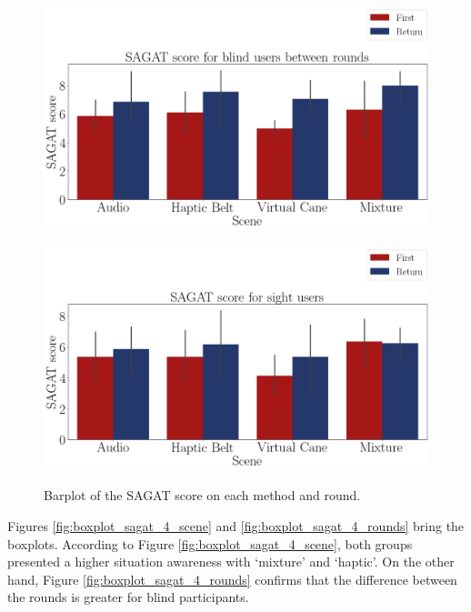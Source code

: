 \begin{figure}[!htb]
    \centering
    \begin{minipage}{\textwidth}
        \centering
        \includegraphics[width = 0.8\linewidth]{Resultados/Sagat/Figuras/png/barplot_sagat_avg_4_scene_blind.png}
        \label{fig:barplot_sagat_avg_4_scene_blind}
    \end{minipage}
    \begin{minipage}{\textwidth}
        \centering
        \includegraphics[width = 0.8\linewidth]{Resultados/Sagat/Figuras/png/barplot_sagat_avg_4_scene_sight.png}
        \label{fig:barplot_sagat_avg_4_scene_sight}
    \end{minipage}
    \caption{Barplot of the SAGAT score on each method and round.}
    \label{fig:barplot_sagat_avg_4_scene_blind_sight}
\end{figure}

Figures \ref{fig:boxplot_sagat_4_scene} and \ref{fig:boxplot_sagat_4_rounds} bring the boxplots. According to Figure \ref{fig:boxplot_sagat_4_scene}, both groups presented a higher situation awareness with ‘mixture’ and ‘haptic’. On the other hand, Figure \ref{fig:boxplot_sagat_4_rounds} confirms that the difference between the rounds is greater for blind participants. 

